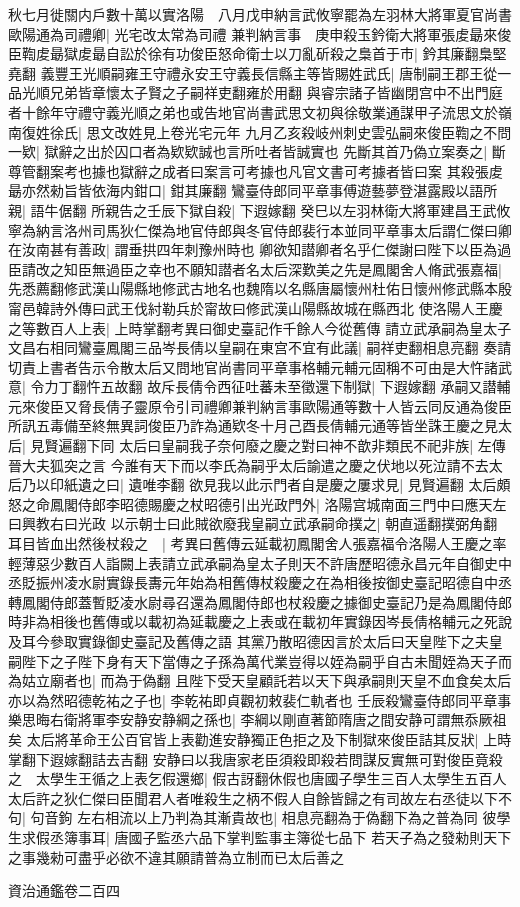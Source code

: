 秋七月徙關内戶數十萬以實洛陽　八月戊申納言武攸寧罷為左羽林大將軍夏官尚書歐陽通為司禮卿|{
	光宅改太常為司禮}
兼判納言事　庚申殺玉鈐衛大將軍張䖍朂來俊臣鞫䖍朂獄䖍朂自訟於徐有功俊臣怒命衛士以刀亂斫殺之梟首于市|{
	鈐其廉翻梟堅堯翻}
義豐王光順嗣雍王守禮永安王守義長信縣主等皆賜姓武氏|{
	唐制嗣王郡王從一品光順兄弟皆章懷太子賢之子嗣祥吏翻雍於用翻}
與睿宗諸子皆幽閉宫中不出門庭者十餘年守禮守義光順之弟也或告地官尚書武思文初與徐敬業通謀甲子流思文於嶺南復姓徐氏|{
	思文改姓見上卷光宅元年}
九月乙亥殺岐州刺史雲弘嗣來俊臣鞫之不問一欵|{
	獄辭之出於囚口者為欵欵誠也言所吐者皆誠實也}
先斷其首乃偽立案奏之|{
	斷尊管翻案考也據也獄辭之成者曰案言可考據也凡官文書可考據者皆曰案}
其殺張䖍朂亦然勑旨皆依海内鉗口|{
	鉗其廉翻}
鸞臺侍郎同平章事傅遊藝夢登湛露殿以語所親|{
	語牛倨翻}
所親告之壬辰下獄自殺|{
	下遐嫁翻}
癸巳以左羽林衛大將軍建昌王武攸寧為納言洛州司馬狄仁傑為地官侍郎與冬官侍郎裴行本並同平章事太后謂仁傑曰卿在汝南甚有善政|{
	謂垂拱四年刺豫州時也}
卿欲知譛卿者名乎仁傑謝曰陛下以臣為過臣請改之知臣無過臣之幸也不願知譛者名太后深歎美之先是鳳閣舍人脩武張嘉福|{
	先悉薦翻修武漢山陽縣地修武古地名也魏隋以名縣唐屬懷州杜佑日懷州修武縣本殷甯邑韓詩外傳曰武王伐紂勒兵於甯故曰修武漢山陽縣故城在縣西北}
使洛陽人王慶之等數百人上表|{
	上時掌翻考異曰御史臺記作千餘人今從舊傳}
請立武承嗣為皇太子文昌右相同鸞臺鳳閣三品岑長倩以皇嗣在東宫不宜有此議|{
	嗣祥吏翻相息亮翻}
奏請切責上書者告示令散太后又問地官尚書同平章事格輔元輔元固稱不可由是大忤諸武意|{
	令力丁翻忤五故翻}
故斥長倩令西征吐蕃未至徵還下制獄|{
	下遐嫁翻}
承嗣又譛輔元來俊臣又脅長倩子靈原令引司禮卿兼判納言事歐陽通等數十人皆云同反通為俊臣所訊五毒備至終無異詞俊臣乃詐為通欵冬十月己酉長倩輔元通等皆坐誅王慶之見太后|{
	見賢遍翻下同}
太后曰皇嗣我子奈何廢之慶之對曰神不歆非類民不祀非族|{
	左傳晉大夫狐突之言}
今誰有天下而以李氏為嗣乎太后諭遣之慶之伏地以死泣請不去太后乃以印紙遺之曰|{
	遺唯李翻}
欲見我以此示門者自是慶之屢求見|{
	見賢遍翻}
太后頗怒之命鳳閣侍郎李昭德賜慶之杖昭德引出光政門外|{
	洛陽宫城南面三門中曰應天左曰興教右曰光政}
以示朝士曰此賊欲廢我皇嗣立武承嗣命撲之|{
	朝直遥翻撲弼角翻}
耳目皆血出然後杖殺之　|{
	考異曰舊傳云延載初鳳閣舍人張嘉福令洛陽人王慶之率輕薄惡少數百人詣闕上表請立武承嗣為皇太子則天不許唐歷昭德永昌元年自御史中丞貶振州凌水尉實錄長夀元年始為相舊傳杖殺慶之在為相後按御史臺記昭德自中丞轉鳳閣侍郎蓋暫貶凌水尉尋召還為鳳閣侍郎也杖殺慶之據御史臺記乃是為鳳閣侍郎時非為相後也舊傳或以載初為延載慶之上表或在載初年實錄因岑長倩格輔元之死說及耳今參取實錄御史臺記及舊傳之語}
其黨乃散昭德因言於太后曰天皇陛下之夫皇嗣陛下之子陛下身有天下當傳之子孫為萬代業豈得以姪為嗣乎自古未聞姪為天子而為姑立廟者也|{
	而為于偽翻}
且陛下受天皇顧託若以天下與承嗣則天皇不血食矣太后亦以為然昭德乾祐之子也|{
	李乾祐即貞觀初敕裴仁軌者也}
壬辰殺鸞臺侍郎同平章事樂思晦右衛將軍李安静安静綱之孫也|{
	李綱以剛直著節隋唐之間安静可謂無忝厥祖矣}
太后將革命王公百官皆上表勸進安静獨正色拒之及下制獄來俊臣詰其反狀|{
	上時掌翻下遐嫁翻詰去吉翻}
安静曰以我唐家老臣須殺即殺若問謀反實無可對俊臣竟殺之　太學生王循之上表乞假還鄉|{
	假古訝翻休假也唐國子學生三百人太學生五百人}
太后許之狄仁傑曰臣聞君人者唯殺生之柄不假人自餘皆歸之有司故左右丞徒以下不句|{
	句音鉤}
左右相流以上乃判為其漸貴故也|{
	相息亮翻為于偽翻下為之普為同}
彼學生求假丞簿事耳|{
	唐國子監丞六品下掌判監事主簿從七品下}
若天子為之發勑則天下之事幾勑可盡乎必欲不違其願請普為立制而已太后善之

資治通鑑卷二百四
